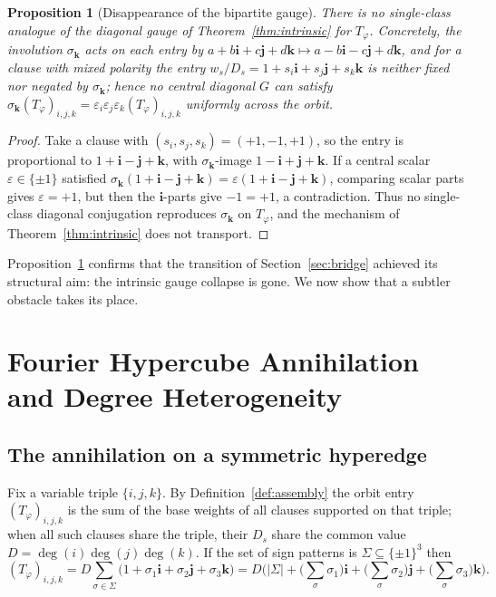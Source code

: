 \documentclass[pdflatex,sn-mathphys-num]{sn-jnl}
\theoremstyle{thmstyleone}%
\newtheorem{proposition}[theorem]{Proposition}%
\theoremstyle{thmstyletwo}%
\theoremstyle{thmstylethree}%
\newcommand{\bi}{\mathbf{i}}
\newcommand{\bj}{\mathbf{j}}
\newcommand{\bk}{\mathbf{k}}
\newcommand{\Tphi}{T_{\varphi}}
\DeclareMathOperator{\deggr}{deg}
\begin{document}
\begin{proposition}[Disappearance of the bipartite gauge]\label{prop:nogauge}
There is no single-class analogue of the diagonal gauge of
Theorem~\ref{thm:intrinsic} for $\Tphi$. Concretely, the involution
$\sigma_{\bk}$ acts on each entry by $a+b\bi+c\bj+d\bk\mapsto a-b\bi-c\bj+d\bk$,
and for a clause with mixed polarity the entry $w_s/D_s=1+s_i\bi+s_j\bj+s_k\bk$
is neither fixed nor negated by $\sigma_{\bk}$; hence no central diagonal
$G$ can satisfy $\sigma_{\bk}(\Tphi)_{i,j,k}=\varepsilon_i\varepsilon_j
\varepsilon_k(\Tphi)_{i,j,k}$ uniformly across the orbit.
\end{proposition}

\begin{proof}
Take a clause with $(s_i,s_j,s_k)=(+1,-1,+1)$, so the entry is proportional
to $1+\bi-\bj+\bk$, with $\sigma_{\bk}$-image $1-\bi+\bj+\bk$. If a central
scalar $\varepsilon\in\{\pm1\}$ satisfied
$\sigma_{\bk}(1+\bi-\bj+\bk)=\varepsilon(1+\bi-\bj+\bk)$, comparing scalar
parts gives $\varepsilon=+1$, but then the $\bi$-parts give $-1=+1$, a
contradiction. Thus no single-class diagonal conjugation reproduces
$\sigma_{\bk}$ on $\Tphi$, and the mechanism of Theorem~\ref{thm:intrinsic}
does not transport.
\end{proof}

Proposition~\ref{prop:nogauge} confirms that the transition of
Section~\ref{sec:bridge} achieved its structural aim: the intrinsic gauge
collapse is gone. We now show that a subtler obstacle takes its place.

\newpage

\section{Fourier Hypercube Annihilation and Degree Heterogeneity}
\label{sec:fourier}

\subsection{The annihilation on a symmetric hyperedge}

Fix a variable triple $\{i,j,k\}$. By Definition~\ref{def:assembly} the
orbit entry $(\Tphi)_{i,j,k}$ is the sum of the base weights of all clauses
supported on that triple; when all such clauses share the triple, their
$D_s$ share the common value $D=\deggr(i)\deggr(j)\deggr(k)$. If the set of
sign patterns is $\Sigma\subseteq\{\pm1\}^3$ then
\begin{equation}\label{eq:orbitsum}
  (\Tphi)_{i,j,k}
   =D\sum_{\sigma\in\Sigma}\big(1+\sigma_1\bi+\sigma_2\bj+\sigma_3\bk\big)
   =D\Big(|\Sigma|+\big(\textstyle\sum_\sigma\sigma_1\big)\bi
      +\big(\sum_\sigma\sigma_2\big)\bj+\big(\sum_\sigma\sigma_3\big)\bk\Big).
\end{equation}
\end{document}
